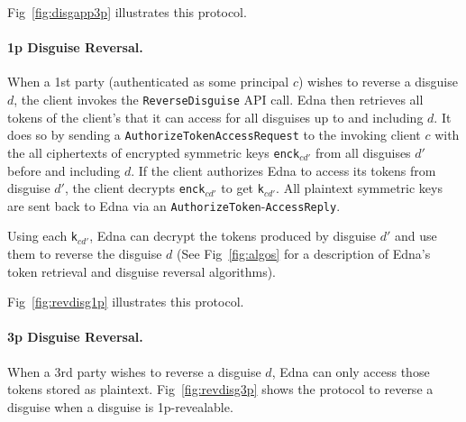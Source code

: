Fig~\ref{fig:disgapp3p} illustrates this protocol.

\paragraph{1p Disguise Reversal.}
When a 1st party (authenticated as some principal $c$) wishes to reverse a disguise $d$, the client
invokes the \texttt{ReverseDisguise} API call. Edna then retrieves all tokens of the client's that
it can access for all disguises up to and including $d$. It does so by sending a
\texttt{AuthorizeToken}\texttt{AccessRequest} to the invoking client $c$ with the all ciphertexts of
encrypted symmetric keys \texttt{enck}$_{cd'}$ from all disguises $d'$ before and including $d$. If
the client authorizes Edna to access its tokens from disguise $d'$, the client decrypts
\texttt{enck}$_{cd'}$ to get \texttt{k}$_{cd'}$. All plaintext symmetric keys are sent back to Edna
via an \texttt{AuthorizeToken}-\texttt{AccessReply}. 

Using each \texttt{k}$_{cd'}$, Edna can decrypt the tokens produced by disguise $d'$ and use them to
reverse the disguise $d$ (See Fig~\ref{fig:algos} for a description of Edna's token retrieval and
disguise reversal algorithms).

Fig~\ref{fig:revdisg1p} illustrates this protocol.

\paragraph{3p Disguise Reversal.}
When a 3rd party wishes to reverse a disguise $d$, Edna can only access those tokens stored as
plaintext. 
Fig~\ref{fig:revdisg3p} shows the protocol to reverse a disguise when a disguise is 1p-revealable.

\begin{figure*}
\caption{3p protocol for disguise application}
\label{fig:disgapp3p}
\end{figure*}


